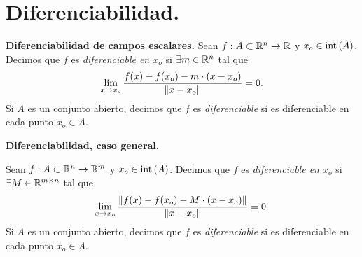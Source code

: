 \documentclass[a4paper]{scrartcl} %
\begin{document}
\section{Diferenciabilidad.} \label{sec:diferenciabilidad}

\begin{definition}\textbf{Diferenciabilidad de campos escalares.} \label{def:dif_escalar}
\mbox{}
Sean $f: A \subset \mathbb{R}^n \to \mathbb{R}$ y $x_o \in \operatorname{int}{(A)}$. Decimos que $f$ es \emph{diferenciable en $x_o$} si $\exists m \in \mathbb{R}^n$ tal que
\[
  \lim_{x \to x_o} \frac{f(x) - f(x_o) - m \cdot (x - x_o)}{\norm{x - x_o}} = 0.
\]
Si $A$ es un conjunto abierto, decimos que $f$ es \emph{diferenciable} si es diferenciable en cada punto $x_o \in A$.
\end{definition}

\begin{definition}\textbf{Diferenciabilidad, caso general.} \label{def:dif_general}
\mbox{}

Sean $f: A \subset \mathbb{R}^n \to \mathbb{R}^m$ y $x_o \in \operatorname{int}{(A)}$. Decimos que $f$ es \emph{diferenciable en $x_o$} si $\exists M \in \mathbb{R}^{m \times n}$ tal que
\[
  \lim_{x \to x_o} \frac{\norm{f(x) - f(x_o) - M \cdot (x - x_o)}}{\norm{x - x_o}} = 0.
\]
Si $A$ es un conjunto abierto, decimos que $f$ es \emph{diferenciable} si es diferenciable en cada punto $x_o \in A$.
\end{definition}
\end{document}
